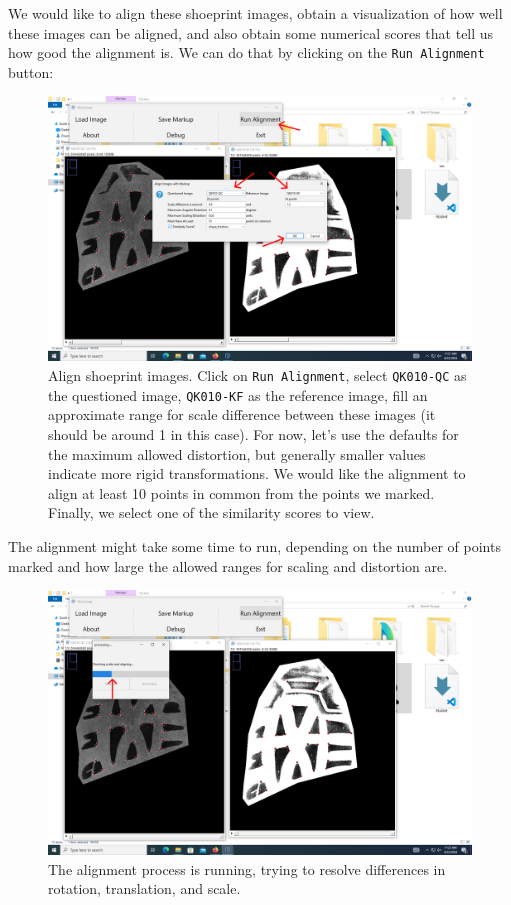 \documentclass[a4paper, oneside]{memoir}
\begin{document}
We would like to align these shoeprint images, obtain a visualization of how well these
images can be aligned, and also obtain some numerical scores that tell us how good the
alignment is. We can do that by clicking on the \texttt{Run Alignment} button:

\begin{figure}[H]
\begin{center}
	\includegraphics[width=0.8\linewidth]{images/step_8a-anno.png}
\end{center}
\caption{Align shoeprint images. Click on \texttt{Run Alignment}, select \texttt{QK010-QC} as the questioned image,
\texttt{QK010-KF} as the reference image, fill an approximate range for scale difference
between these images (it should be around 1 in this case). For now, let's use the defaults
for the maximum allowed distortion, but generally smaller values indicate more rigid
transformations. We would like the alignment to align at least 10 points in common from
the points we marked. Finally, we select one of the similarity scores to view.}
\label{fig:step8a}
\end{figure}

The alignment might take some time to run, depending on the number of points marked and
how large the allowed ranges for scaling and distortion are.

\begin{figure}[H]
\begin{center}
	\includegraphics[width=0.8\linewidth]{images/step_8b-anno.png}
\end{center}
\caption{The alignment process is running, trying to resolve differences in rotation,
translation, and scale.}
\label{fig:step8b}
\end{figure}
\end{document}

